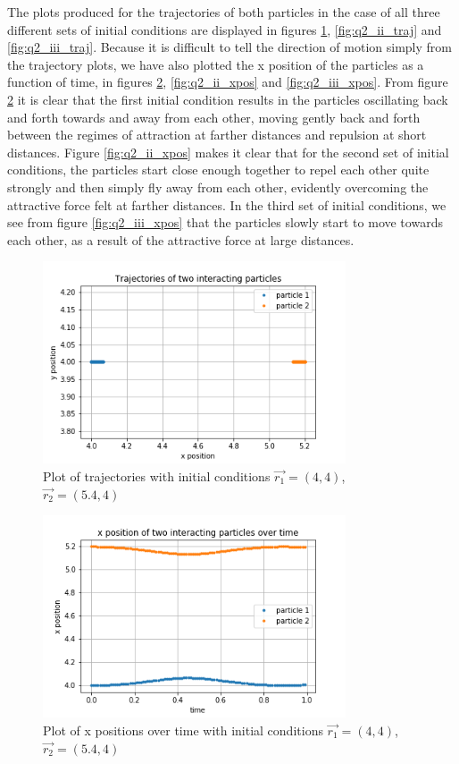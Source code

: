 \documentclass{article}
\begin{document}
The plots produced for the trajectories of both particles in the case of all three different sets of initial conditions are displayed in figures \ref{fig:q2_i_traj}, \ref{fig:q2_ii_traj} and \ref{fig:q2_iii_traj}. Because it is difficult to tell the direction of motion simply from the trajectory plots, we have also plotted the x position of the particles as a function of time, in figures \ref{fig:q2_i_xpos}, \ref{fig:q2_ii_xpos} and \ref{fig:q2_iii_xpos}. From figure \ref{fig:q2_i_xpos} it is clear that the first initial condition results in the particles oscillating back and forth towards and away from each other, moving gently back and forth between the regimes of attraction at farther distances and repulsion at short distances. Figure \ref{fig:q2_ii_xpos} makes it clear that for the second set of initial conditions, the particles start close enough together to repel each other quite strongly and then simply fly away from each other, evidently overcoming the attractive force felt at farther distances. In the third set of initial conditions, we see from figure \ref{fig:q2_iii_xpos} that the particles slowly start to move towards each other, as a result of the attractive force at large distances.

\begin{figure}[H]
	\centering
	\includegraphics[width=0.8\textwidth]{../images/q2_i_traj.png}
	\caption{Plot of trajectories with initial conditions $\vec{r_1}=(4,4)$, $\vec{r_2}=(5.4,4)$}
	\label{fig:q2_i_traj}
\end{figure}

\begin{figure}[H]
	\centering
	\includegraphics[width=0.8\textwidth]{../images/q2_i_xpos.png}
	\caption{Plot of x positions over time with initial conditions $\vec{r_1}=(4,4)$, $\vec{r_2}=(5.4,4)$}
	\label{fig:q2_i_xpos}
\end{figure}
\end{document}
